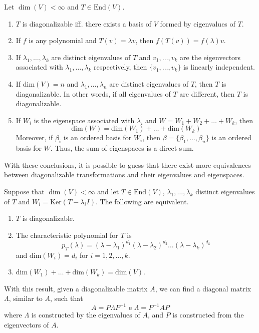 \begin{theorem}
	Let $\dim(V) < \infty$ and $T \in \text{End}(V)$.
	\begin{enumerate}
		\item $T$ is diagonalizable iff. there exists a basis of $V$ formed by eigenvalues of $T$.
		\item If $f$ is any polynomial and $T(v)=\lambda v$, then $f(T(v)) = f(\lambda)v$.
		\item If $\lambda_1, \ldots, \lambda_k$ are distinct eigenvalues of $T$ and $v_1, \ldots, v_k$ are the eigenvectors associated with $\lambda_1, \ldots, \lambda_k$ respectively, then $\{ v_1, \ldots, v_k \}$ is linearly independent.
		\item If $\text{dim}(V)=n$ and $\lambda_1, \ldots, \lambda_n$ are distinct eigenvalues of $T$, then $T$ is diagonalizable. In other words, if all eigenvalues of $T$ are different, then $T$ is diagonalizable.
		\item If $W_i$ is the eigenspace associated with $\lambda_i$ and $W = W_1 + W_2 + \ldots + W_k$, then \[ \text{dim} (W) = \text{dim} (W_1) + \ldots + \text{dim} (W_k) \] Moreover, if $\beta_i$ is an ordered basis for $W_i$, then $\beta = \{ \beta_1, \ldots, \beta_n \}$ is an ordered basis for $W$. Thus, the sum of eigenspaces is a direct sum.
	\end{enumerate}
\end{theorem}

With these conclusions, it is possible to guess that there exist more equivalences between diagonalizable transformations and their eigenvalues and eigenspaces.

\begin{theorem}
	Suppose that $\dim(V) < \infty$ and let $T \in \text{End}(V)$, $\lambda_1, \ldots, \lambda_k$ distinct eigenvalues of $T$ and $W_i = \text{Ker}(T - \lambda_i I)$. The following are equivalent.
	\begin{enumerate}
		\item $T$ is diagonalizable.
		\item The characteristic polynomial for $T$ is \[ p_T(\lambda) = (\lambda - \lambda_1)^{d_1} (\lambda - \lambda_2)^{d_2} \ldots (\lambda - \lambda_k)^{d_k} \] and $\text{dim}(W_i) = d_i$ for $i = 1, 2, \ldots, k$.
		\item $\text{dim}(W_1) + \ldots + \text{dim}(W_k) = \text{dim}(V)$.
	\end{enumerate}
\end{theorem}

With this result, given a diagonalizable matrix $A$, we can find a diagonal matrix $\Lambda$, similar to $A$, such that
\[
A = P \Lambda P^{-1} \text{ e } \Lambda = P^{-1} A P
\]
where $\Lambda$ is constructed by the eigenvalues of $A$, and $P$ is constructed from the eigenvectors of $A$.


